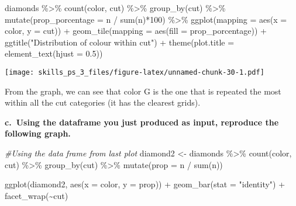 \documentclass[
]{article}
\newenvironment{Shaded}{\begin{snugshade}}{\end{snugshade}}
\newcommand{\AttributeTok}[1]{\textcolor[rgb]{0.77,0.63,0.00}{#1}}
\newcommand{\CommentTok}[1]{\textcolor[rgb]{0.56,0.35,0.01}{\textit{#1}}}
\newcommand{\DecValTok}[1]{\textcolor[rgb]{0.00,0.00,0.81}{#1}}
\newcommand{\FloatTok}[1]{\textcolor[rgb]{0.00,0.00,0.81}{#1}}
\newcommand{\FunctionTok}[1]{\textcolor[rgb]{0.00,0.00,0.00}{#1}}
\newcommand{\NormalTok}[1]{#1}
\newcommand{\OtherTok}[1]{\textcolor[rgb]{0.56,0.35,0.01}{#1}}
\newcommand{\SpecialCharTok}[1]{\textcolor[rgb]{0.00,0.00,0.00}{#1}}
\newcommand{\StringTok}[1]{\textcolor[rgb]{0.31,0.60,0.02}{#1}}
\begin{document}
\begin{Shaded}
\begin{Highlighting}[]
\NormalTok{diamonds }\SpecialCharTok{\%\textgreater{}\%}
  \FunctionTok{count}\NormalTok{(color, cut) }\SpecialCharTok{\%\textgreater{}\%}
  \FunctionTok{group\_by}\NormalTok{(cut) }\SpecialCharTok{\%\textgreater{}\%}
  \FunctionTok{mutate}\NormalTok{(}\AttributeTok{prop\_porcentage =}\NormalTok{ n }\SpecialCharTok{/} \FunctionTok{sum}\NormalTok{(n)}\SpecialCharTok{*}\DecValTok{100}\NormalTok{) }\SpecialCharTok{\%\textgreater{}\%}
  \FunctionTok{ggplot}\NormalTok{(}\AttributeTok{mapping =} \FunctionTok{aes}\NormalTok{(}\AttributeTok{x =}\NormalTok{ color, }\AttributeTok{y =}\NormalTok{ cut)) }\SpecialCharTok{+}
  \FunctionTok{geom\_tile}\NormalTok{(}\AttributeTok{mapping =} \FunctionTok{aes}\NormalTok{(}\AttributeTok{fill =}\NormalTok{ prop\_porcentage)) }\SpecialCharTok{+}
  \FunctionTok{ggtitle}\NormalTok{(}\StringTok{"Distribution of colour within cut"}\NormalTok{) }\SpecialCharTok{+}
  \FunctionTok{theme}\NormalTok{(}\AttributeTok{plot.title =} \FunctionTok{element\_text}\NormalTok{(}\AttributeTok{hjust =} \FloatTok{0.5}\NormalTok{))}
\end{Highlighting}
\end{Shaded}

\texttt{[image: skills\_ps\_3\_files/figure-latex/unnamed-chunk-30-1.pdf]}

From the graph, we can see that color G is the one that is repeated the
most within all the cut categories (it has the clearest grids).

\textbf{c.~Using the dataframe you just produced as input, reproduce the
following graph.}

\begin{Shaded}
\begin{Highlighting}[]
\CommentTok{\#Using the data frame from last plot}
\NormalTok{diamond2 }\OtherTok{\textless{}{-}}\NormalTok{ diamonds }\SpecialCharTok{\%\textgreater{}\%}
  \FunctionTok{count}\NormalTok{(color, cut) }\SpecialCharTok{\%\textgreater{}\%}
  \FunctionTok{group\_by}\NormalTok{(cut) }\SpecialCharTok{\%\textgreater{}\%}
  \FunctionTok{mutate}\NormalTok{(}\AttributeTok{prop =}\NormalTok{ n }\SpecialCharTok{/} \FunctionTok{sum}\NormalTok{(n))}

\FunctionTok{ggplot}\NormalTok{(diamond2, }\FunctionTok{aes}\NormalTok{(}\AttributeTok{x =}\NormalTok{ color, }\AttributeTok{y =}\NormalTok{ prop)) }\SpecialCharTok{+}
  \FunctionTok{geom\_bar}\NormalTok{(}\AttributeTok{stat =} \StringTok{"identity"}\NormalTok{) }\SpecialCharTok{+}
  \FunctionTok{facet\_wrap}\NormalTok{(}\SpecialCharTok{\textasciitilde{}}\NormalTok{cut)}
\end{Highlighting}
\end{Shaded}
\end{document}
